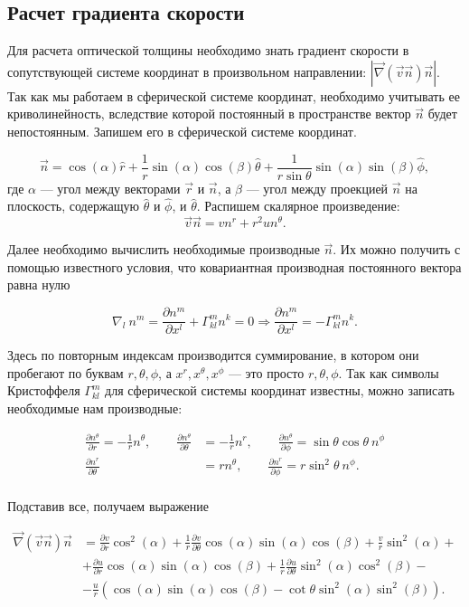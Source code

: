 \documentclass[12pt]{article}
\begin{document}
\newpage

\subsection{Расчет градиента скорости}

Для расчета оптической толщины необходимо знать градиент скорости в сопутствующей системе координат в произвольном направлении: $|\vec{\nabla} (\vec{v}\vec{n})\vec{n}|$. Так как мы работаем в сферической системе координат, необходимо учитывать ее криволинейность, вследствие которой постоянный в пространстве вектор $\vec{n}$ будет непостоянным. Запишем его в сферической системе координат.

\[
\vec{n} = \cos(\alpha)\hat{r} + \frac{1}{r}\sin(\alpha)\cos(\beta)\hat{\theta} + \frac{1}{r\sin\theta}\sin(\alpha)\sin(\beta)\hat{\phi},
\] 
где $\alpha$ --- угол между векторами $\vec{r}$ и $\vec{n}$, а $\beta$ --- угол между проекцией $\vec{n}$ на плоскость, содержащую $\hat{\theta}$ и $\hat{\phi}$, и $\hat{\theta}$. Распишем скалярное произведение:
\[
\vec{v}\vec{n} = vn^r + r^2 u n^\theta.
\]

Далее необходимо вычислить необходимые производные $\vec{n}$. Их можно получить с помощью известного условия, что ковариантная производная постоянного вектора равна нулю 

\[
\nabla_l\ n^m = \frac{\partial n^m}{\partial x^l} + \Gamma^m_{kl} n^k = 0 \Rightarrow \frac{\partial n^m}{\partial x^l} = -\Gamma^m_{kl} n^k.
\]

Здесь по повторным индексам производится суммирование, в котором они пробегают по буквам $r,\theta,\phi$, а $x^r, x^\theta, x^\phi$ --- это просто $r, \theta, \phi$. Так как символы Кристоффеля $\Gamma^m_{kl}$ для сферической системы координат известны, можно записать необходимые нам производные:

\[
\begin{aligned}
\frac{\partial n^\theta}{\partial r} = -\frac{1}{r}n^\theta, \qquad \frac{\partial n^\theta}{\partial \theta} &= -\frac{1}{r}n^r , \qquad \frac{\partial n^\theta}{\partial \phi} = \sin\theta\cos\theta\ n^\phi \\
\frac{\partial n^r}{\partial\theta} &= rn^\theta, \qquad \frac{\partial n^r}{\partial \phi} = r\sin^2\theta\ n^\phi. \\
\end{aligned}
\]

Подставив все, получаем выражение

\begin{align} \label{eq:vecgrad}
\vec{\nabla}(\vec{v}\vec{n})\vec{n} & = \frac{\partial v}{\partial r}\cos^2(\alpha) + \frac{1}{r}\frac{\partial v}{\partial \theta}\cos(\alpha)\sin(\alpha)\cos(\beta) + \frac{v}{r}\sin^2(\alpha) + \nonumber \\
& + \frac{\partial u}{\partial r} \cos(\alpha)\sin(\alpha)\cos(\beta) + \frac{1}{r}\frac{\partial u}{\partial \theta} \sin^2(\alpha)\cos^2(\beta) - \nonumber \\
& - \frac{u}{r}\left(\cos(\alpha)\sin(\alpha)\cos(\beta) - \cot\theta\sin^2(\alpha)\sin^2(\beta)\right).
\end{align}
\end{document}
